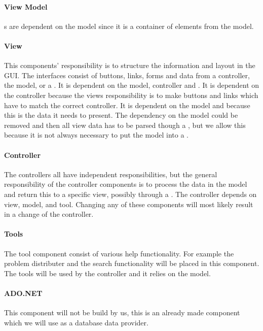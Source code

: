 \paragraph{View Model}
\viewmodel[c]s are dependent on the model since it is a container of elements from the model.


\paragraph{View} 
This components' responsibility is to structure the information and layout in the GUI. 
The interfaces consist of buttons, links, forms and data from a controller, the model, or a \viewmodel[]. 
It is dependent on the model, controller and \viewmodel[]. It is dependent on the controller because the views responsibility is to make buttons and links which have to match the correct controller. It is dependent on the model and \viewmodel[] because this is the data it needs to present. 
The dependency on the model could be removed and then all view data has to be parsed though a \viewmodel[], but we allow this because it is not always necessary to put the model into a \viewmodel[]. 

\paragraph{Controller}
The controllers all have independent responsibilities, but the general responsibility of the controller components is to process the data in the model and return this to a specific view, possibly through a \viewmodel[]. The controller depends on view, model, \viewmodel{} and tool. Changing any of these components will most likely result in a change of the controller. 

\paragraph{Tools}
The tool component consist of various help functionality. For example the problem distributer and the search functionality will be placed in this component. The tools will be used by the controller and it relies on the model. 

\paragraph{ADO.NET}
This component will not be build by us, this is an already made component which we will use as a database data provider. 




